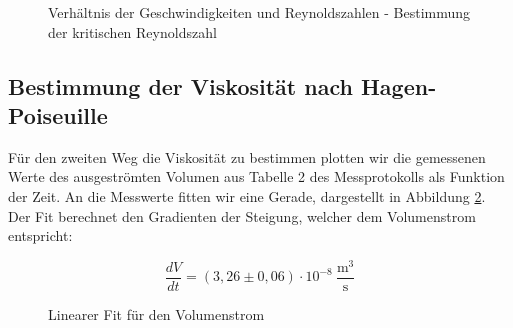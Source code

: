 \documentclass{article}
\begin{document}
\phantom{.}

\begin{figure}[!h]
    \centering
    \caption{Verhältnis der Geschwindigkeiten und Reynoldszahlen - Bestimmung der kritischen Reynoldszahl}
    \label{fig:StokesReynold}
\end{figure}

\clearpage
\newpage
\subsection{Bestimmung der Viskosität nach Hagen-Poiseuille}

Für den zweiten Weg die Viskosität zu bestimmen plotten wir die gemessenen Werte des ausgeströmten Volumen aus Tabelle 2 des Messprotokolls als Funktion der Zeit. An die Messwerte fitten wir eine Gerade, dargestellt in Abbildung \ref{fig:FitHP}. Der Fit berechnet den Gradienten der Steigung, welcher dem Volumenstrom entspricht:

\begin{equation}
    \frac{dV}{dt} = (3,26 \pm 0,06) \cdot 10^{-8} \ \frac{\text{m}^3}{\text{s}}
\end{equation}

\phantom{.}

\begin{figure}[!h]
    \centering
    \caption{Linearer Fit für den Volumenstrom}
    \label{fig:FitHP}
\end{figure}
\end{document}
